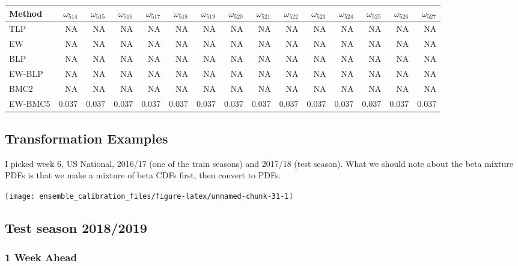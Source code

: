 \documentclass[
]{article}
\begin{document}
\begin{tabular}{lrrrrrrrrrrrrrr}
\toprule
Method & $\omega_{514}$ & $\omega_{515}$ & $\omega_{516}$ & $\omega_{517}$ & $\omega_{518}$ & $\omega_{519}$ & $\omega_{520}$ & $\omega_{521}$ & $\omega_{522}$ & $\omega_{523}$ & $\omega_{524}$ & $\omega_{525}$ & $\omega_{526}$ & $\omega_{527}$\\
\midrule
TLP & NA & NA & NA & NA & NA & NA & NA & NA & NA & NA & NA & NA & NA & NA\\
EW & NA & NA & NA & NA & NA & NA & NA & NA & NA & NA & NA & NA & NA & NA\\
BLP & NA & NA & NA & NA & NA & NA & NA & NA & NA & NA & NA & NA & NA & NA\\
EW-BLP & NA & NA & NA & NA & NA & NA & NA & NA & NA & NA & NA & NA & NA & NA\\
BMC2 & NA & NA & NA & NA & NA & NA & NA & NA & NA & NA & NA & NA & NA & NA\\
EW-BMC5 & 0.037 & 0.037 & 0.037 & 0.037 & 0.037 & 0.037 & 0.037 & 0.037 & 0.037 & 0.037 & 0.037 & 0.037 & 0.037 & 0.037\\
\bottomrule
\end{tabular}

\newpage

\hypertarget{transformation-examples}{%
\subsection{Transformation Examples}\label{transformation-examples}}

I picked week 6, US National, 2016/17 (one of the train seasons) and
2017/18 (test season). What we should note about the beta mixture PDFs
is that we make a mixture of beta CDFs first, then convert to PDFs.

\begin{center}\texttt{[image: ensemble\_calibration\_files/figure-latex/unnamed-chunk-31-1]} \end{center}

\newpage

\hypertarget{test-season-20182019-1}{%
\subsection{Test season 2018/2019}\label{test-season-20182019-1}}

\hypertarget{week-ahead-20}{%
\subsubsection{1 Week Ahead}\label{week-ahead-20}}
\end{document}
